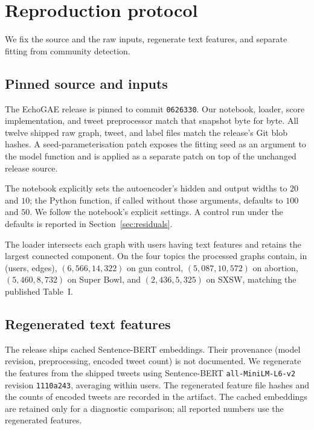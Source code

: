\section{Reproduction protocol}
\label{sec:protocol}

We fix the source and the raw inputs, regenerate text features, and separate fitting from community detection.

\subsection{Pinned source and inputs}

The EchoGAE release is pinned to commit \texttt{0626330}. Our notebook, loader, score implementation, and tweet preprocessor match that snapshot byte for byte. All twelve shipped raw graph, tweet, and label files match the release's Git blob hashes. A seed-parameterisation patch exposes the fitting seed as an argument to the model function and is applied as a separate patch on top of the unchanged release source.

The notebook explicitly sets the autoencoder's hidden and output widths to $20$ and $10$; the Python function, if called without those arguments, defaults to $100$ and $50$. We follow the notebook's explicit settings. A control run under the defaults is reported in Section~\ref{sec:residuals}.

The loader intersects each graph with users having text features and retains the largest connected component. On the four topics the processed graphs contain, in (users, edges), $(6{,}566, 14{,}322)$ on gun control, $(5{,}087, 10{,}572)$ on abortion, $(5{,}460, 8{,}732)$ on Super Bowl, and $(2{,}436, 5{,}325)$ on SXSW, matching the published Table~I.

\subsection{Regenerated text features}

The release ships cached Sentence-BERT embeddings. Their provenance (model revision, preprocessing, encoded tweet count) is not documented. We regenerate the features from the shipped tweets using Sentence-BERT \texttt{all-MiniLM-L6-v2} revision \texttt{1110a243}, averaging within users. The regenerated feature file hashes and the counts of encoded tweets are recorded in the artifact. The cached embeddings are retained only for a diagnostic comparison; all reported numbers use the regenerated features.

